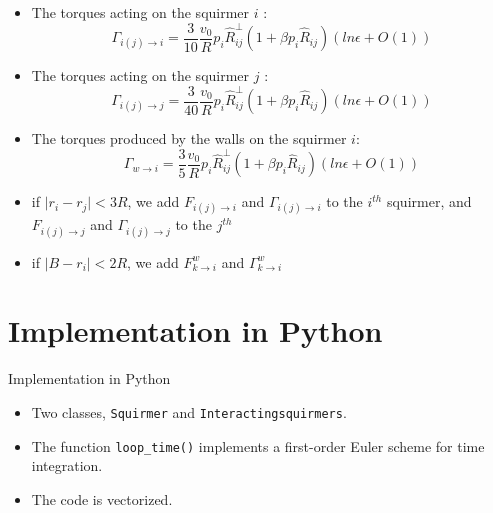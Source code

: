 \documentclass{beamer}
\begin{document}
\begin{frame}
    \begin{itemize}
        \item The torques acting on the squirmer $i$ :
        \begin{equation*}
        \boxed{\Gamma_{i(j)\rightarrow i} = \frac{3}{10}\frac{v_0}{R}p_i\hat{R}_{ij}^{\perp}(1 + \beta p_i\hat{R}_{ij})(ln \epsilon + O(1))}
    \end{equation*}
        \item The torques acting on the squirmer $j$ :
        \begin{equation*}
        \boxed{\Gamma_{i(j)\rightarrow j} = \frac{3}{40}\frac{v_0}{R}p_i\hat{R}_{ij}^{\perp}(1 + \beta p_i\hat{R}_{ij})(ln \epsilon + O(1))}
    \end{equation*}
        \item The torques produced by the walls on the squirmer $i$:
        \begin{equation*}
            \boxed{\Gamma_{w\rightarrow i} = \frac{3}{5} \frac{v_0}{R}p_i\hat{R}_{ij}^{\perp}(1 + \beta p_i\hat{R}_{ij})(ln \epsilon + O(1))}
        \end{equation*}
    \end{itemize}
    \begin{itemize}
        \item if $\lvert r_i-r_j\rvert < 3R$, we add $F_{i(j)\rightarrow i}$ and $\Gamma_{i(j)\rightarrow i}$ to the $i^{th}$ squirmer, and $F_{i(j)\rightarrow j}$ and $\Gamma_{i(j)\rightarrow j}$ to the $j^{th}$
        \item if $\lvert B-r_i\rvert < 2R$, we add $F_{k\rightarrow i}^w$ and $\Gamma_{k\rightarrow i}^w$
    \end{itemize}
\end{frame}

\section{Implementation in Python}
\begin{frame}{Implementation in Python}
\begin{itemize}
    \item Two classes, \texttt{Squirmer} and \texttt{Interactingsquirmers}.
    \item The function \texttt{loop\_time()} implements a first-order Euler scheme for time integration.
    \item The code is vectorized.
\end{itemize}
\end{frame}
\end{document}
